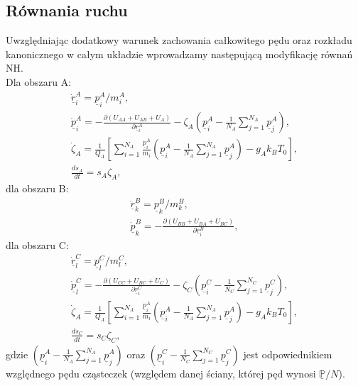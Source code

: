 \documentclass[12pt,a4paper,openright]{report} %
\begin{document}
\subsection{Równania ruchu}
Uwzględniając dodatkowy warunek zachowania całkowitego pędu oraz rozkładu kanonicznego w całym układzie wprowadzamy następującą modyfikację równań NH.
\\
Dla obszaru A:
\begin{equation}
\begin{gathered}
\underline{\dot{r}}^A_i=\underline{p}^A_i/m_i^A, \\
\underline{\dot{p}}^A_i=- \frac{\partial (U_{AA} + U_{AB} +U_{A})}{\partial \underline{r}^A_i}-\zeta_A (\underline{p}^A_i-\frac{1}{N_A}\sum_{j=1}^{N_A} \underline{p}^A_j), \\
\dot{\zeta}_A=\frac{1}{Q_A} \left[ \sum_{i=1}^{N_A} \frac{{\underline{p}^A_i}}{m_i} \left( \underline{p}^A_i-\frac{1}{N_A}\sum_{j=1}^{N_A} \underline{p}^A_j \right) -g_A k_B T_0 \right], \\
\frac{d s_A}{d t}=s_A \zeta_A,
\end{gathered}
\label{b24}
\end{equation}
%
dla obszaru B:
\begin{equation}
\begin{gathered}
\underline{\dot{r}}^B_k=\underline{p}^B_k/m_k^B,\\
\underline{\dot{p}}^B_k=- \frac{\partial (U_{BB} + U_{BA} +U_{BC})}{\partial \underline{r}^B_i},
\end{gathered}
\label{b25}
\end{equation}
%
dla obszaru C:
\begin{equation}
\begin{gathered}
\underline{\dot{r}}^C_l=\underline{p}^C_l/m_l^C,\\
\underline{\dot{p}}^C_l=- \frac{\partial (U_{CC} + U_{BC} +U_{C})}{\partial \underline{r}^C_i}-\zeta_C (\underline{p}^C_i-\frac{1}{N_C}\sum_{j=1}^{N_C} \underline{p}^C_j),\\
\dot{\zeta}_A=\frac{1}{Q_A} \left[ \sum_{i=1}^{N_A} \frac{{\underline{p}^A_i}}{m_i} \left( \underline{p}^A_i-\frac{1}{N_A}\sum_{j=1}^{N_A} \underline{p}^A_j \right) -g_A k_B T_0 \right], \\
\frac{d s_C}{d t}=s_C \zeta_C,
\end{gathered}
\label{b26}
\end{equation}
%
gdzie $(\underline{p}^A_i-\frac{1}{N_A}\sum_{j=1}^{N_A} \underline{p}^A_j)$ oraz $(\underline{p}^C_i-\frac{1}{N_C}\sum_{j=1}^{N_C} \underline{p}^C_j)$ jest odpowiednikiem względnego pędu cząsteczek (względem danej ściany, której pęd wynosi ${\underline{\mathbb{P}}}/{N}$).\\
%
%
\end{document}
